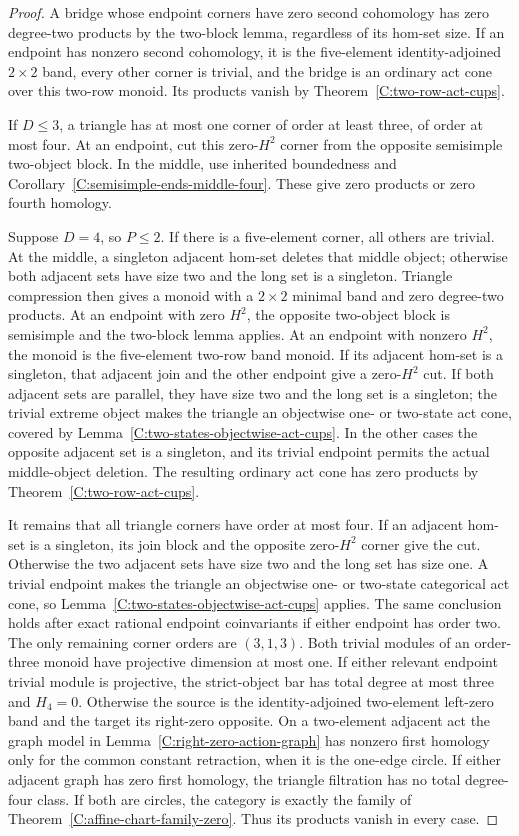 \begin{proof}
A bridge whose endpoint corners have zero second
cohomology has zero degree-two products by the two-block
lemma, regardless of its hom-set size.  If an endpoint
has nonzero second cohomology, it is the five-element
identity-adjoined $2\times2$ band, every other corner is
trivial, and the bridge is an ordinary act cone over this
two-row monoid.  Its products vanish by
Theorem~\ref{C:two-row-act-cups}.

If $D\leq3$, a triangle has at most one corner of order
at least three, of order at most four.  At an endpoint,
cut this zero-$H^2$ corner from the opposite semisimple
two-object block.  In the middle, use inherited boundedness
and Corollary~\ref{C:semisimple-ends-middle-four}.
These give zero products or zero fourth homology.

Suppose $D=4$, so $P\leq2$.  If there is a five-element
corner, all others are trivial.  At the middle, a singleton
adjacent hom-set deletes that middle object; otherwise both
adjacent sets have size two and the long set is a singleton.
Triangle compression then gives a monoid with a $2\times2$
minimal band and zero degree-two products.
At an endpoint with zero $H^2$, the opposite two-object
block is semisimple and the two-block lemma applies.
At an endpoint with nonzero $H^2$, the monoid is the
five-element two-row band monoid.  If its adjacent hom-set
is a singleton, that adjacent join and the other endpoint
give a zero-$H^2$ cut.  If both adjacent sets are parallel,
they have size two and the long set is a singleton; the
trivial extreme object makes the triangle an objectwise
one- or two-state act cone, covered by
Lemma~\ref{C:two-states-objectwise-act-cups}.
In the other cases the opposite adjacent set is a singleton,
and its trivial endpoint permits the actual middle-object
deletion.  The resulting ordinary act cone has zero products
by Theorem~\ref{C:two-row-act-cups}.

It remains that all triangle corners have order at most
four.  If an adjacent hom-set is a singleton, its join
block and the opposite zero-$H^2$ corner give the cut.
Otherwise the two adjacent sets have size two and the
long set has size one.  A trivial endpoint makes the
triangle an objectwise one- or two-state categorical act
cone, so Lemma~\ref{C:two-states-objectwise-act-cups}
applies.  The same conclusion holds after exact rational
endpoint coinvariants if either endpoint has order two.
The only remaining corner orders are $(3,1,3)$.
Both trivial modules of an order-three monoid have
projective dimension at most one.  If either relevant
endpoint trivial module is projective, the strict-object
bar has total degree at most three and $H_4=0$.
Otherwise the source is the identity-adjoined two-element
left-zero band and the target its right-zero opposite.
On a two-element adjacent act the graph model in
Lemma~\ref{C:right-zero-action-graph} has nonzero first
homology only for the common constant retraction, when
it is the one-edge circle.  If either adjacent graph has
zero first homology, the triangle filtration has no total
degree-four class.  If both are circles, the category is
exactly the family of
Theorem~\ref{C:affine-chart-family-zero}.
Thus its products vanish in every case.


\end{proof}
